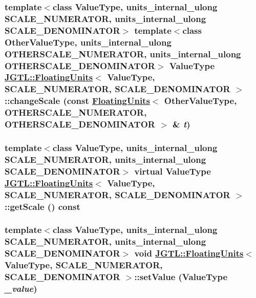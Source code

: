 \hypertarget{class_j_g_t_l_1_1_floating_units_c7e85ddf1877abac6e7a77f035d68a1b}{
\subsubsection[changeScale]{\setlength{\rightskip}{0pt plus 5cm}template$<$class Value\-Type, units\_\-internal\_\-ulong SCALE\_\-NUMERATOR, units\_\-internal\_\-ulong SCALE\_\-DENOMINATOR$>$ template$<$class Other\-Value\-Type, units\_\-internal\_\-ulong OTHERSCALE\_\-NUMERATOR, units\_\-internal\_\-ulong OTHERSCALE\_\-DENOMINATOR$>$ Value\-Type \hyperlink{class_j_g_t_l_1_1_floating_units}{JGTL::Floating\-Units}$<$ Value\-Type, SCALE\_\-NUMERATOR, SCALE\_\-DENOMINATOR $>$::change\-Scale (const \hyperlink{class_j_g_t_l_1_1_floating_units}{Floating\-Units}$<$ Other\-Value\-Type, OTHERSCALE\_\-NUMERATOR, OTHERSCALE\_\-DENOMINATOR $>$ \& {\em t})}}
\label{class_j_g_t_l_1_1_floating_units_c7e85ddf1877abac6e7a77f035d68a1b}


\hypertarget{class_j_g_t_l_1_1_floating_units_38ce55dd061c7b566f2a146ad062816a}{
\subsubsection[getScale]{\setlength{\rightskip}{0pt plus 5cm}template$<$class Value\-Type, units\_\-internal\_\-ulong SCALE\_\-NUMERATOR, units\_\-internal\_\-ulong SCALE\_\-DENOMINATOR$>$ virtual Value\-Type \hyperlink{class_j_g_t_l_1_1_floating_units}{JGTL::Floating\-Units}$<$ Value\-Type, SCALE\_\-NUMERATOR, SCALE\_\-DENOMINATOR $>$::get\-Scale () const}}
\label{class_j_g_t_l_1_1_floating_units_38ce55dd061c7b566f2a146ad062816a}


\hypertarget{class_j_g_t_l_1_1_floating_units_b4f0691c805340b545251b6216a406f3}{
\subsubsection[setValue]{\setlength{\rightskip}{0pt plus 5cm}template$<$class Value\-Type, units\_\-internal\_\-ulong SCALE\_\-NUMERATOR, units\_\-internal\_\-ulong SCALE\_\-DENOMINATOR$>$ void \hyperlink{class_j_g_t_l_1_1_floating_units}{JGTL::Floating\-Units}$<$ Value\-Type, SCALE\_\-NUMERATOR, SCALE\_\-DENOMINATOR $>$::set\-Value (Value\-Type {\em \_\-value})}}
\label{class_j_g_t_l_1_1_floating_units_b4f0691c805340b545251b6216a406f3}


